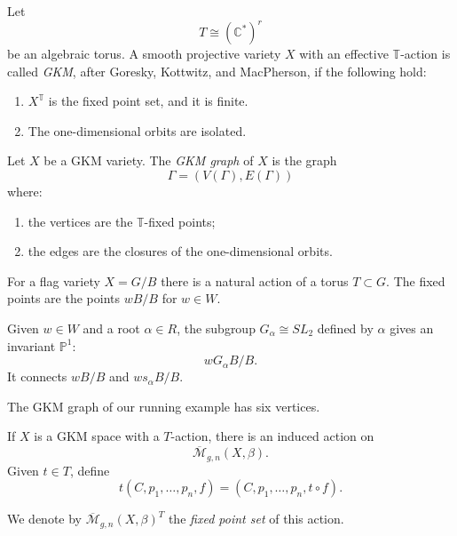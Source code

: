 \begin{definition}
\label{definition-let-t2}
Let
\[
T\cong (\mathbb{C}^*)^r
\]
be an algebraic torus.
A smooth projective variety $X$ with
an effective $\mathbb{T}$-action is
called {\it GKM}, after Goresky,
Kottwitz, and
MacPherson, if the following hold:
\begin{enumerate}
\item $X^{\mathbb{T}}$ is the fixed
point set, and it is finite.
\item The one-dimensional orbits are
isolated.
\end{enumerate}
\end{definition}

\begin{definition}
\label{definition-let-x}
Let $X$ be a GKM variety.
The {\it GKM graph} of $X$ is the graph
\[
\Gamma=(V(\Gamma),E(\Gamma))
\]
where:
\begin{enumerate}
\item the vertices are the
$\mathbb{T}$-fixed points;
\item the edges are the closures of the
one-dimensional orbits.
\end{enumerate}
\end{definition}

\begin{remark}
\label{remark-flag-variety2}
For a flag variety $X=G/B$ there is a
natural action of a torus $T\subset G$.
The fixed points are the points
$wB/B$ for $w\in W$.

Given $w\in W$ and a root
$\alpha\in R$, the subgroup
$G_\alpha\cong SL_2$ defined by
$\alpha$ gives an invariant
$\mathbb{P}^1$:
\[
wG_\alpha B/B.
\]
It connects $wB/B$ and
$ws_\alpha B/B$.
\end{remark}

\begin{remark}
\label{remark-gkm-graph}
The GKM graph of our running example
has six vertices.
\end{remark}

\begin{definition}
\label{definition-x-gkm}
If $X$ is a GKM space with a
$T$-action, there is an induced action
on
\[
\overline{\mathcal M}_{g,n}(X,\beta).
\]
Given $t\in T$, define
\[
t(C,p_1,\dots,p_n,f)
=
(C,p_1,\dots,p_n,t\circ f).
\]

We denote by
$\overline{\mathcal M}_{g,n}(X,\beta)^T$
the {\it fixed point set} of this
action.
\end{definition}

